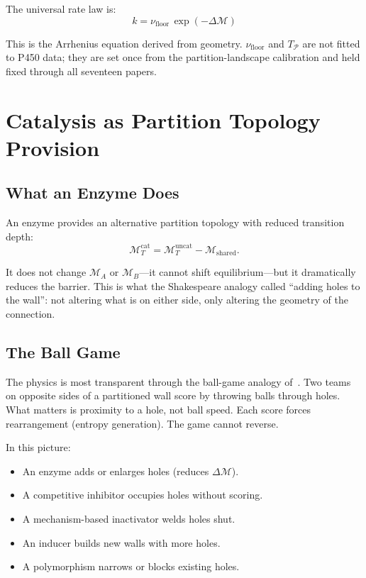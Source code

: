 \documentclass[11pt,twocolumn,a4paper]{article}
\theoremstyle{definition}
\theoremstyle{remark}
\newcommand{\Depth}{\mathcal{M}}
\newcommand{\Part}{\mathcal{P}}
\newcommand{\nufloor}{\nu_{\mathrm{floor}}}
\newcommand{\Tpart}{T_{\Part}}
\begin{document}
The universal rate law is:
\begin{equation}
    \boxed{k = \nufloor\,\exp(-\Delta\Depth)}
    \label{eq:rate}
\end{equation}

This is the Arrhenius equation derived from geometry.  $\nufloor$ and $\Tpart$
are not fitted to P450 data; they are set once from the partition-landscape
calibration and held fixed through all seventeen papers.

\section{Catalysis as Partition Topology Provision}
\label{sec:catalysis}

\subsection{What an Enzyme Does}

An enzyme provides an alternative partition topology with reduced transition
depth:
\begin{equation}
    \Depth_T^{\mathrm{cat}} = \Depth_T^{\mathrm{uncat}} - \Depth_{\mathrm{shared}}.
\end{equation}

It does not change $\Depth_A$ or $\Depth_B$---it cannot shift equilibrium---but
it dramatically reduces the barrier.  This is what the Shakespeare analogy
called ``adding holes to the wall'': not altering what is on either side, only
altering the geometry of the connection.

\subsection{The Ball Game}

The physics is most transparent through the ball-game analogy
of~\citep{sachikonye2025_bpl}.  Two teams on opposite sides of a partitioned
wall score by throwing balls through holes.  What matters is proximity to a
hole, not ball speed.  Each score forces rearrangement (entropy generation).
The game cannot reverse.

In this picture:
\begin{itemize}[nosep]
    \item An enzyme adds or enlarges holes (reduces $\Delta\Depth$).
    \item A competitive inhibitor occupies holes without scoring.
    \item A mechanism-based inactivator welds holes shut.
    \item An inducer builds new walls with more holes.
    \item A polymorphism narrows or blocks existing holes.
\end{itemize}
\end{document}

